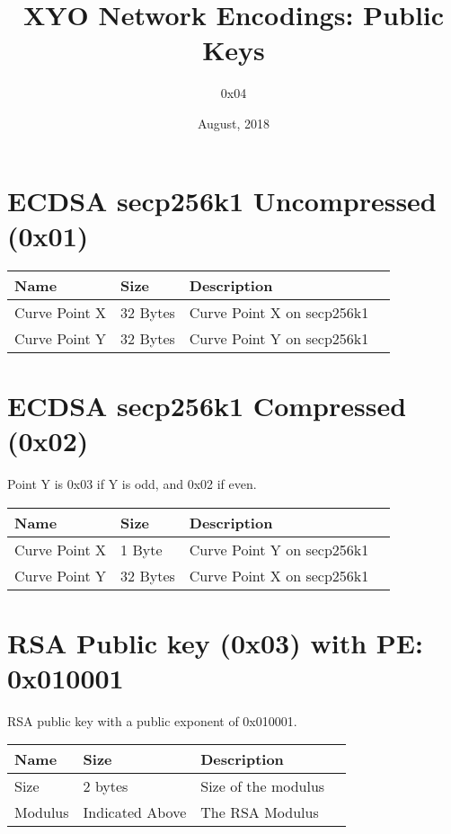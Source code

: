 \documentclass[11pt]{article}
\title{XYO Network Encodings: Public Keys}
\author{0x04}
\date{August, 2018}
\begin{document}
\maketitle

\section{ECDSA secp256k1 Uncompressed (0x01)}

\begin{center}
\begin{tabular}{ |l|l|l|l| } 
\hline
\textbf{Name} & \textbf{Size} & \textbf{Description}\\
\hline
Curve Point X & 32 Bytes & Curve Point X on secp256k1\\
Curve Point Y & 32 Bytes & Curve Point Y on secp256k1\\ 
   
\hline
\end{tabular}
\end{center}

\section{ECDSA secp256k1 Compressed (0x02)}
Point Y is 0x03 if Y is odd, and 0x02 if even.

\begin{center}
\begin{tabular}{ |l|l|l|l| } 
\hline
\textbf{Name} & \textbf{Size} & \textbf{Description}\\
\hline
Curve Point X & 1 Byte & Curve Point Y on secp256k1\\
Curve Point Y & 32 Bytes & Curve Point X on secp256k1\\ 
   
\hline
\end{tabular}
\end{center}

\section{RSA Public key (0x03) with PE: 0x010001}
RSA public key with a public exponent of 0x010001.

\begin{center}
\begin{tabular}{ |l|l|l|l| } 
\hline
\textbf{Name} & \textbf{Size} & \textbf{Description}\\
\hline
Size & 2 bytes & Size of the modulus \\
Modulus & Indicated Above & The RSA Modulus\\ 
   
\hline
\end{tabular}
\end{center}
\end{document}
